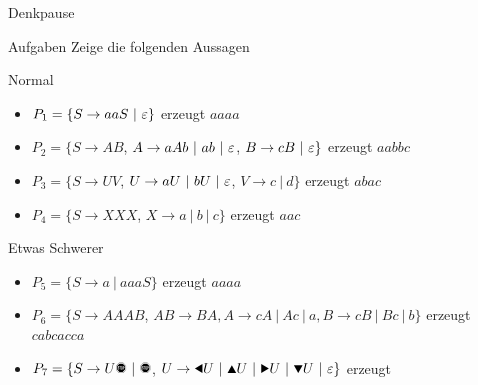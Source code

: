 {
\begin{frame}{Denkpause}
    \begin{alertblock}{Aufgaben}
        Zeige die folgenden Aussagen
    \end{alertblock}
    \begin{block}{Normal}
        \begin{itemize}
            \item $P_1=\{S\rightarrow aaS\ |\ \emptyWord\}$ erzeugt $aaaa$
            \item $P_2=\{S\rightarrow AB$, $A\rightarrow aAb \ |\ ab\ |\ \emptyWord$, $B\rightarrow cB \ |\  \emptyWord\}$ erzeugt $aabbc$
            \item $P_3=\{S\rightarrow UV$, $U\rightarrow aU \ |\  bU \ |\  \emptyWord$, $V\rightarrow c \ |\  d\}$ erzeugt $abac$
            \item $P_4=\{S\rightarrow XXX$, $X\rightarrow a \ |\  b \ |\  c\}$ erzeugt $aac$
        \end{itemize}
    \end{block}
    \begin{block}{Etwas Schwerer}
        \begin{itemize}
            \item $P_5=\{S\rightarrow a \ |\  aaaS\}$ erzeugt $aaaa$
            \item $P_6=\{S\rightarrow AAAB$, $AB\rightarrow BA,
                      A\rightarrow cA \ |\  Ac \ |\ a,
                      B\rightarrow cB \ |\  Bc \ |\  b\}$ erzeugt $cabcacca$
            \item $P_7=\{S\rightarrow U\text{\Stopsign} \ |\  \text{\Stopsign}$, $U\rightarrow \text{\Rewind} U \ |\  \text{\MoveUp} U \ |\  \text{\Forward} U \ |\  \text{\MoveDown} U \ |\ \emptyWord\}$ erzeugt \Forward\Stopsign
        \end{itemize}
    \end{block}
\end{frame}
}

